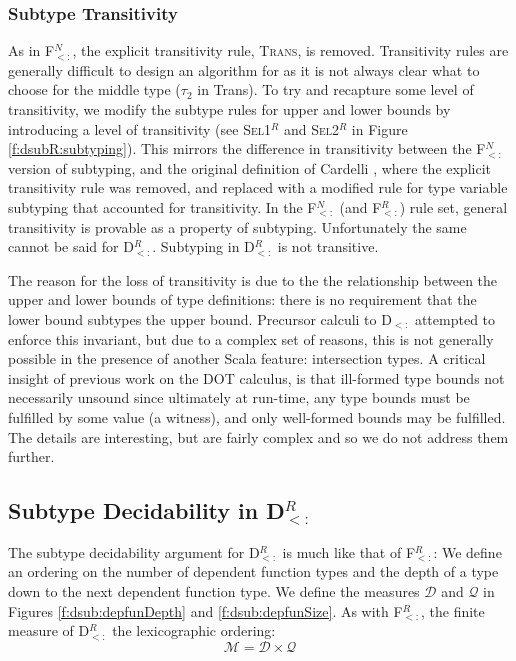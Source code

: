 \documentclass[runningheads, anon]{llncs}
\begin{document}
\subsubsection{Subtype Transitivity}
As in F$_{<:}^N$, the explicit transitivity rule, \textsc{Trans}, is removed. Transitivity 
rules are generally difficult to design an algorithm for as it is not always clear what to choose for the middle type ($\tau_2$ in Trans).
To try and recapture some level of transitivity, we modify the subtype rules for upper and lower bounds  by introducing a 
level of transitivity (see \textsc{Sel1$^R$} and \textsc{Sel2$^R$} in Figure \ref{f:dsubR:subtyping}). This mirrors the difference
in transitivity between the F$_{<:}^N$ version of \Fsub subtyping, and the original definition of Cardelli \cite{cardelli1991}, 
where the explicit transitivity rule was removed, and replaced with a modified rule for type variable subtyping that accounted 
for transitivity. In the F$_{<:}^N$ (and F$_{<:}^R$) rule set, general transitivity is provable as a property of subtyping. Unfortunately 
the same cannot be said for D$_{<:}^R$. Subtyping in D$_{<:}^R$ is not transitive. 

The reason for the loss of transitivity is due to the the relationship between the upper and lower bounds of type definitions:
there is no requirement that the lower bound subtypes the upper bound. Precursor calculi to D$_{<:}$ attempted to 
enforce this invariant, but due to a complex set of reasons, this is not generally possible in the presence of another Scala 
feature: intersection types. A critical insight of previous work on the DOT calculus, is that ill-formed type bounds not 
necessarily unsound \cite{amin2012dependent, Amin:2014:FPT:2660193.2660216, Rompf:2016:TSD:2983990.2984008} since ultimately at run-time, any type bounds must be fulfilled by some value (a witness), 
and only well-formed bounds may be fulfilled. The details are interesting, but are fairly complex and so we do not 
address them further.

\subsection{Subtype Decidability in D$_{<:}^R$}

The subtype decidability  argument for D$_{<:}^R$ is much like that of F$_{<:}^R$: We define an ordering on the number of 
dependent function types and the depth of a type down to the next dependent function type. 
We define the measures $\mathcal{D}$ and $\mathcal{Q}$ in Figures \ref{f:dsub:depfunDepth}
and \ref{f:dsub:depfunSize}. As with F$_{<:}^R$, the finite measure of D$_{<:}^R$ the lexicographic ordering:
$$\mathcal{M} = \mathcal{D} \times \mathcal{Q}$$
\end{document}
